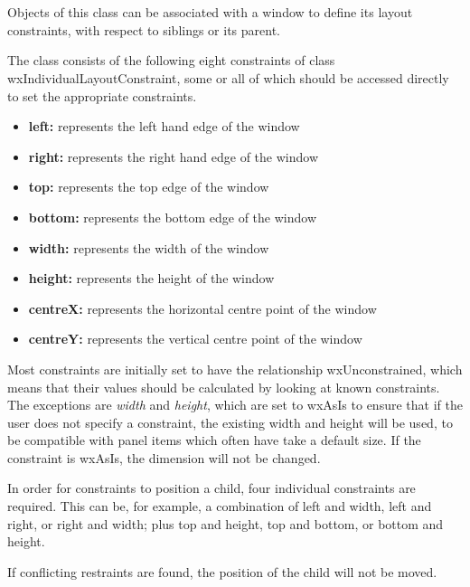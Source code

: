 \section{}\label{wxlayoutconstraints}

Objects of this class can be associated with a window to define its
layout constraints, with respect to siblings or its parent.

The class consists of the following eight constraints of class wxIndividualLayoutConstraint,
some or all of which should be accessed directly to set the appropriate
constraints.

\begin{itemize}\itemsep=0pt
\item {\bf left:} represents the left hand edge of the window
\item {\bf right:} represents the right hand edge of the window
\item {\bf top:} represents the top edge of the window
\item {\bf bottom:} represents the bottom edge of the window
\item {\bf width:} represents the width of the window
\item {\bf height:} represents the height of the window
\item {\bf centreX:} represents the horizontal centre point of the window
\item {\bf centreY:} represents the vertical centre point of the window
\end{itemize}

Most constraints are initially set to have the relationship wxUnconstrained,
which means that their values should be calculated by looking at known constraints.
The exceptions are {\it width} and {\it height}, which are set to wxAsIs to
ensure that if the user does not specify a constraint, the existing
width and height will be used, to be compatible with panel items which often
have take a default size. If the constraint is wxAsIs, the dimension will
not be changed.

In order for constraints to position a child, four individual constraints are required.
This can be, for example, a combination of left and width, left and right, or right and width;
plus top and height, top and bottom, or bottom and height. 

If conflicting restraints are found, the position of the child
will not be moved.


